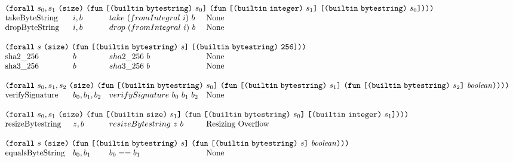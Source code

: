 \documentclass[../main.tex]{subfiles}
\begin{document}
\begin{figure*}[t]
\[\begin{array}{llll}
        \multicolumn{4}{l}{
          \forallT{s_0,s_1}{\sizeK{}}{
            \funT{\appT{\builtinT{\builtinBytestringType{}}}{s_0}}
                 {\funT{\appT{\builtinT{\builtinIntegerType{}}}{s_1}}
                       {\appT{\builtinT{\builtinBytestringType{}}}{s_0}}}}}\\
        \mathrm{takeByteString}    &   i, b     & take ~ (fromIntegral ~ i) ~ b   &   \textrm{None} \\
        \mathrm{dropByteString}    &   i, b     & drop ~ (fromIntegral ~ i) ~ b   &   \textrm{None} \\
        &&\\
        
        \multicolumn{4}{l}{
          \forallT{s}{\sizeK{}}{
            \funT{\appT{\builtinT{\builtinBytestringType{}}}{s}}
                 {\appT{\builtinT{\builtinBytestringType{}}}{\size{256}}}}}\\
        \mathrm{sha2\_256}         &   b           & sha2\_256 ~ b    & \textrm{None}                \\
        \mathrm{sha3\_256}         &   b           & sha3\_256~ b     & \textrm{None}                \\
        &&\\
        
        \multicolumn{4}{l}{
          \forallT{s_0,s_1,s_2}{\sizeK{}}{
            \funT{\appT{\builtinT{\builtinBytestringType{}}}{s_0}}
                 {\funT{\appT{\builtinT{\builtinBytestringType{}}}{s_1}}
                       {\funT{\appT{\builtinT{\builtinBytestringType{}}}{s_2}}
                             {\mathit{boolean}}}}}}\\
        \mathrm{verifySignature}   &   b_0, b_1, b_2           & verifySignature ~ b_0 ~ b_1 ~ b_2   &   \textrm{None}          \\
        &&\\
        
        \multicolumn{4}{l}{
          \forallT{s_0,s_1}{\sizeK{}}{
            \funT{\appT{\builtinT{\builtinSizeType{}}}{s_1}}
                 {\funT{\appT{\builtinT{\builtinBytestringType{}}}{s_0}}
                       {\appT{\builtinT{\builtinIntegerType{}}}{s_1}}}}} \\
        \mathrm{resizeBytestring}   &   z, b   &   resizeBytestring ~ z ~ b   &   \textrm{Resizing Overflow} \\
        &&\\
        
        \multicolumn{4}{l}{
          \forallT{s}{\sizeK{}}{
            \funT{\appT{\builtinT{\builtinBytestringType{}}}{s}}
                 {\funT{\appT{\builtinT{\builtinBytestringType{}}}{s}}
                       {\mathit{boolean}}}}}\\
        \mathrm{equalsByteString}  &   b_0 , b_1   & b_0 == b_1   &   \textrm{None}  \\
        &&\\
        

\end{array}\]
\end{figure*}
\end{document}
